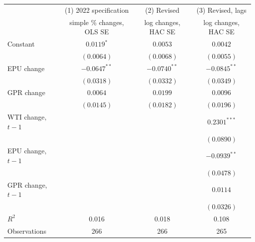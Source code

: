 \begin{tabular}{lccc}
\toprule
 & (1) 2022 specification & (2) Revised & (3) Revised, lags \\
 & simple \% changes, OLS SE & log changes, HAC SE & log changes, HAC SE \\
\midrule
Constant & $0.0119^{*}$ & $0.0053$ & $0.0042$ \\
 & $(0.0064)$ & $(0.0068)$ & $(0.0055)$ \\
EPU change & $-0.0647^{**}$ & $-0.0740^{**}$ & $-0.0845^{**}$ \\
 & $(0.0318)$ & $(0.0332)$ & $(0.0349)$ \\
GPR change & $0.0064$ & $0.0199$ & $0.0096$ \\
 & $(0.0145)$ & $(0.0182)$ & $(0.0196)$ \\
WTI change, $t-1$ &  &  & $0.2301^{***}$ \\
 &  &  & $(0.0890)$ \\
EPU change, $t-1$ &  &  & $-0.0939^{**}$ \\
 &  &  & $(0.0478)$ \\
GPR change, $t-1$ &  &  & $0.0114$ \\
 &  &  & $(0.0326)$ \\
\midrule
$R^2$ & 0.016 & 0.018 & 0.108 \\
Observations & 266 & 266 & 265 \\
\bottomrule
\end{tabular}
